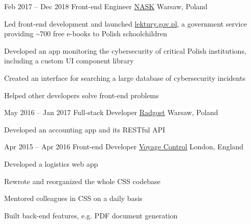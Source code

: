 \begin{sectionlist}
    \jobentry
        {Feb 2017 -- Dec 2018}
        {Front-end Engineer}
        {\href{https://www.nask.pl}{NASK}}
        {Warsaw, Poland}
        {
            \begin{jobentrylist}
                \item Led front-end development and launched
                    \href{https://lektury.gov.pl/}{lektury.gov.pl}, a government
                    service providing \textasciitilde{}700 free e-books to
                    Polish schoolchildren
                \item Developed an app monitoring the cybersecurity of critical
                    Polish institutions, including a custom UI component library
                \item Created an interface for searching a large database of
                    cybersecurity incidents
                \item Helped other developers solve front-end problems
            \end{jobentrylist}
        }

    \jobentry
        {May 2016 -- Jan 2017}
        {Full-stack Developer}
        {\href{https://radgost.pl}{Radgost}}
        {Warsaw, Poland}
        {
            \begin{jobentrylist}
                \item Developed an accounting app and its RESTful
                    API
            \end{jobentrylist}
        }

    \jobentry
        {Apr 2015 -- Apr 2016}
        {Front-end Developer}
        {\href{https://voyagecontrol.com}{Voyage Control}}
        {London, England}
        {
            \begin{jobentrylist}
                \item Developed a logistics web app
                \item Rewrote and reorganized the whole CSS codebase
                \item Mentored colleagues in CSS on a daily basis
                \item Built back-end features, e.g. PDF document generation
            \end{jobentrylist}
        }


\end{sectionlist}
